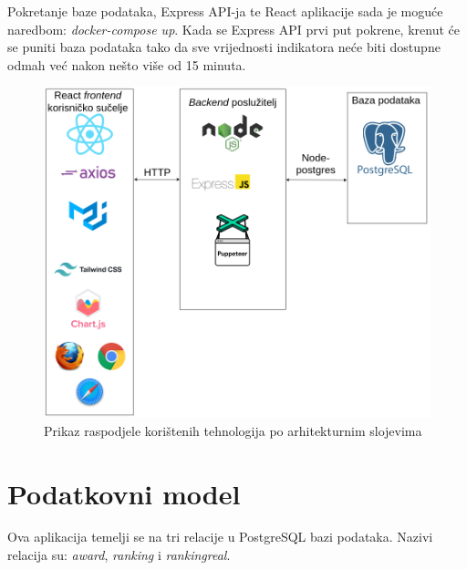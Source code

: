 \documentclass[times, utf8, zavrsni]{fer}
\begin{document}
Pokretanje baze podataka, Express API-ja te React aplikacije sada je moguće naredbom: \emph{docker-compose up}. Kada se Express API prvi put pokrene, krenut će se 
puniti baza podataka tako da sve vrijednosti indikatora neće biti dostupne odmah već nakon nešto više od 15 minuta.
\begin{figure}[htb]
    \centering
    \includegraphics[scale=0.3]{tehnologije.png}
    \caption{Prikaz raspodjele korištenih tehnologija po arhitekturnim slojevima}
    \label{fig:arhitektura}
    \end{figure}
           \chapter{Podatkovni model}
           Ova aplikacija temelji se na tri relacije u PostgreSQL bazi podataka. Nazivi relacija su: \emph{award}, \emph{ranking} i \emph{rankingreal}.
\end{document}
